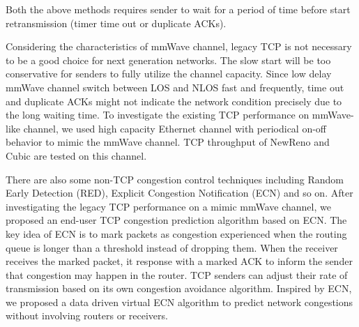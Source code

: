 Both the above methods requires sender to wait for a period of time before start retransmission (timer time out or duplicate ACKs). 
\par Considering the characteristics of mmWave channel, legacy TCP is not necessary to be a good choice for next generation networks. The slow start will be too conservative for senders to fully utilize the channel capacity. Since low delay mmWave channel switch between LOS and NLOS fast and frequently, time out and duplicate ACKs might not indicate the network condition precisely due to the long waiting time. To investigate the existing TCP performance on mmWave-like channel, we used high capacity  Ethernet channel with periodical on-off behavior to mimic the mmWave channel. TCP throughput of NewReno and Cubic  are tested on this channel. 
\par There are also some non-TCP congestion control techniques including Random Early Detection (RED), Explicit Congestion Notification (ECN) and so on. After investigating the legacy TCP performance on a mimic mmWave channel, we proposed an end-user TCP congestion prediction algorithm based on ECN. The key idea of ECN is to mark packets as congestion experienced when the routing queue is longer than a threshold instead of dropping them. When the receiver receives the marked packet, it response with a marked ACK to inform the sender that congestion may happen in the router. TCP senders can adjust their rate of transmission based on its own congestion avoidance algorithm. Inspired by ECN, we proposed a data driven virtual ECN algorithm to predict network congestions without involving routers or receivers.
